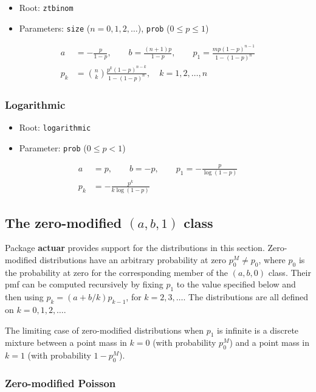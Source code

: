 \documentclass[x11names]{article}
\newcommand{\pkg}[1]{\textbf{#1}}
\newcommand{\code}[1]{\texttt{#1}}
\begin{document}
\begin{itemize}
\item Root: \code{ztbinom}
\item Parameters: \code{size} ($n = 0, 1, 2, \dots$),
  \code{prob} ($0 \leq p \leq 1$)
\end{itemize}
\begin{align*}
  a &= -\frac{p}{1 - p}, \qquad b = \frac{(n + 1)p}{1 - p}, \qquad
      p_1 = \frac{m p (1 - p)^{n - 1}}{1 - (1 - p)^n} \\
  p_k &= \binom{n}{k} \frac{p^k (1 - p)^{n - k}}{1 - (1 - p)^n}, \quad
        k = 1, 2, \dots, n
\end{align*}

\subsubsection{Logarithmic}

\begin{itemize}
\item Root: \code{logarithmic}
\item Parameter: \code{prob} ($0 \leq p < 1$)
\end{itemize}
\begin{align*}
  a &= p, \qquad b = -p, \qquad
      p_1 = - \frac{p}{\log (1 - p)} \\
  p_k &= - \frac{p^k}{k \log (1 - p)}
\end{align*}


\subsection[The zero-modified (a, b, 1) class]{The zero-modified $(a, b, 1)$ class}
\label{sec:app:discrete:zm}

Package \pkg{actuar} provides support for the distributions in this
section. Zero-modified distributions have an arbitrary probability at
zero $p_0^M \neq p_0$, where $p_0$ is the probability at zero for the
corresponding member of the $(a, b, 0)$ class. Their pmf can be
computed recursively by fixing $p_1$ to the value specified below and
then using $p_k = (a + b/k) p_{k - 1}$, for $k = 2, 3, \dots$. The
distributions are all defined on $k = 0, 1, 2, \dots$.

The limiting case of zero-modified distributions when $p_1$ is
infinite is a discrete mixture between a point mass in $k = 0$ (with
probability $p_0^M$) and a point mass in $k = 1$ (with probability
$1 - p_0^M$).

\subsubsection{Zero-modified Poisson}
\end{document}
